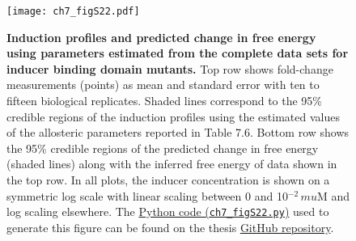 \documentclass[12pt]{caltech_thesis}
\begin{document}
\hypertarget{fig:global_IND_profiles}{%
\begin{figure}
\centering
\texttt{[image: ch7\_figS22.pdf]}
\caption[{Induction profiles and predicted change in free energy using
parameters estimated from the complete data sets for inducer binding
domain mutants.}]{\textbf{Induction profiles and predicted change in
free energy using parameters estimated from the complete data sets for
inducer binding domain mutants.} Top row shows fold-change measurements
(points) as mean and standard error with ten to fifteen biological
replicates. Shaded lines correspond to the 95\% credible regions of the
induction profiles using the estimated values of the allosteric
parameters reported in Table 7.6. Bottom row shows the 95\% credible
regions of the predicted change in free energy (shaded lines) along with
the inferred free energy of data shown in the top row. In all plots, the
inducer concentration is shown on a symmetric log scale with linear
scaling between 0 and 10\(^{-2}\, mu\)M and log scaling elsewhere. The
\href{https://github.com/gchure/phd/blob/master/src/chapter_07/code/ch7_figS22.py}{Python
code (\texttt{ch7\_figS22.py})} used to generate this figure can be
found on the thesis \href{https://github.com/gchure/phd}{GitHub
repository}.}
\label{fig:global_IND_profiles}
\end{figure}
}
\end{document}
